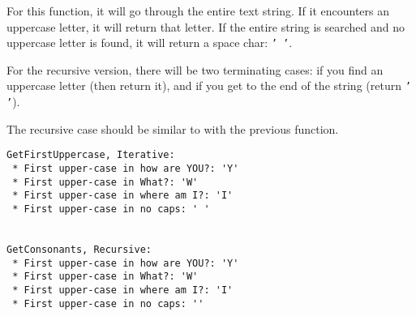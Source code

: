 For this function, it will go through the entire text string.
If it encounters an uppercase letter, it will return that letter.
If the entire string is searched and no uppercase letter is found,
it will return a space char: \texttt{' '}.

For the recursive version, there will be two terminating cases:
if you find an uppercase letter (then return it), and if
you get to the end of the string (return \texttt{' '}).

The recursive case should be similar to with the previous function.

\begin{lstlisting}[style=output]
GetFirstUppercase, Iterative:
 * First upper-case in how are YOU?: 'Y'
 * First upper-case in What?: 'W'
 * First upper-case in where am I?: 'I'
 * First upper-case in no caps: ' '


GetConsonants, Recursive:
 * First upper-case in how are YOU?: 'Y'
 * First upper-case in What?: 'W'
 * First upper-case in where am I?: 'I'
 * First upper-case in no caps: ''
\end{lstlisting}










